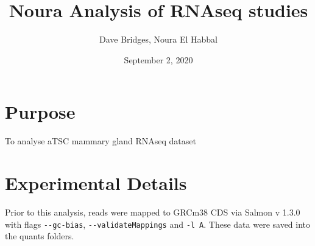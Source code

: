 \documentclass[]{article}
\title{Noura Analysis of RNAseq studies}
\author{Dave Bridges, Noura El Habbal}
\date{September 2, 2020}
\begin{document}
\maketitle

{
\setcounter{tocdepth}{2}
\tableofcontents
}
\hypertarget{purpose}{%
\section{Purpose}\label{purpose}}

To analyse aTSC mammary gland RNAseq dataset

\hypertarget{experimental-details}{%
\section{Experimental Details}\label{experimental-details}}

Prior to this analysis, reads were mapped to GRCm38 CDS via Salmon v
1.3.0 with flags \texttt{-\/-gc-bias}, \texttt{-\/-validateMappings} and
\texttt{-l\ A}. These data were saved into the quants folders.
\end{document}
